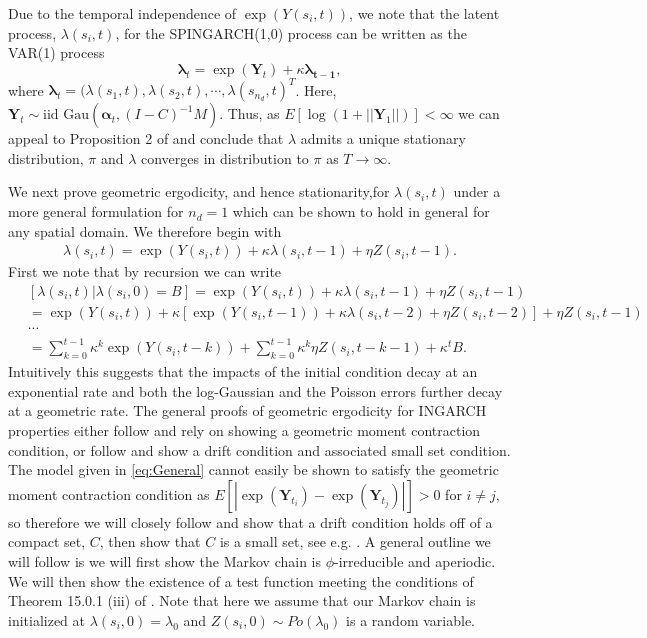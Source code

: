 \documentclass[11pt]{isuthesis}
\begin{document}
Due to the temporal independence of $\exp(Y(s_i,t))$, we note that the latent process, $\lambda(s_i,t)$, for the SPINGARCH(1,0) process can be written as the VAR(1) process
\begin{equation}
	\boldsymbol{\lambda}_t=\exp(\boldsymbol{Y}_t)+\kappa\boldsymbol{\lambda_{t-1}},
\end{equation}
where $\boldsymbol{\lambda}_{t} = (\lambda(s_1,t),\lambda(s_2,t),\cdots,\lambda(s_{n_d},t)^T$.  Here, $\boldsymbol{Y}_t \sim \mbox{iid Gau}\left(\boldsymbol{\alpha}_t,(I-C)^{-1}M\right)$.  Thus, as $E[\log \left(1+||\boldsymbol{Y}_1||\right)]<\infty$ we can appeal to Proposition 2 of \cite{zeevi2004recurrence} and conclude that $\lambda$ admits a unique stationary distribution, $\pi$ and $\lambda$ converges in distribution to $\pi$ as $T\to \infty$.

We next prove geometric ergodicity, and hence stationarity,for $\lambda(s_i,t)$ under a more general formulation for $n_d=1$ which can be shown to hold in general for any spatial domain.  We therefore begin with
\begin{align}
	\lambda(s_i,t)= \exp(Y(s_i,t))+\kappa \lambda(s_i,t-1) + \eta Z(s_i,t-1) \label{eq:General}.
\end{align}
First we note that by recursion we can write
\begin{align}
	& [\lambda(s_i,t)|\lambda(s_i,0)=B] = \exp(Y(s_i,t))+\kappa \lambda(s_i,t-1) + \eta Z(s_i,t-1)\nonumber\\\
	& = \exp(Y(s_i,t))+\kappa \left[\exp(Y(s_i,t-1))+\kappa \lambda(s_i,t-2) + \eta Z(s_i,t-2)\right] + \eta Z(s_i,t-1)\nonumber\\
	&\cdots\nonumber\\
	& =\sum_{k=0}^{t-1} \kappa^k\exp(Y(s_i,t-k)) +\sum_{k=0}^{t-1} \kappa^k\eta Z(s_i,t-k-1)+\kappa^t B. \label{eq:Recursion}
\end{align} 
Intuitively this suggests that the impacts of the initial condition decay at an exponential rate and both the log-Gaussian and the Poisson errors further decay at a geometric rate.  The general proofs of geometric ergodicity for INGARCH properties either follow \cite{davis2016theory} and rely on showing a geometric moment contraction condition, or follow \cite{fokianos2009poisson} and show a drift condition and associated small set condition.  The model given in \eqref{eq:General} cannot easily be shown to satisfy the geometric moment contraction condition as $E[|\exp(\boldsymbol{Y}_{t_i})-\exp(\boldsymbol{Y}_{t_j})|]>0$ for $i \neq j$, so therefore we will closely follow \cite{fokianos2009poisson} and show that a drift condition holds off of a compact set, $C$, then show that $C$ is a small set, see e.g. \cite{meyn2012markov}.  A general outline we will follow is we will first show the Markov chain is $\phi$-irreducible and aperiodic.  We will then show the existence of a test function meeting the conditions of Theorem 15.0.1 (iii) of \cite{meyn2012markov}.  Note that here we assume that our Markov chain is initialized at $\lambda(s_i,0)=\lambda_0$ and $Z(s_i,0)\sim Po(\lambda_0)$ is a random variable.
\end{document}
